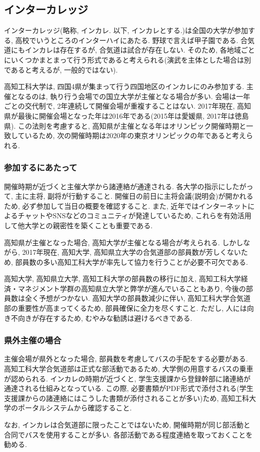\documentclass[a4j,titlepage]{jarticle}
\begin{document}
\subsection{インターカレッジ}
インターカレッジ(略称, インカレ. 以下, インカレとする.)は全国の大学が参加する, 高校でいうところのインターハイにあたる. 野球で言えば甲子園である. 合気道にもインカレは存在するが, 合気道は試合が存在しない. そのため, 各地域ごとにいくつかまとまって行う形式であると考えられる(演武を主体とした場合は別であると考えるが, 一般的ではない). \par
高知工科大学は, 四国4県が集まって行う四国地区のインカレにのみ参加する. 主催となるのは, 執り行う会場での国立大学が主催となる場合が多い. 会場は一年ごとの交代制で, 2年連続して開催会場が重複することはない. 2017年現在, 高知県が最後に開催会場となった年は2016年である(2015年は愛媛県, 2017年は徳島県). この法則を考慮すると, 高知県が主催となる年はオリンピック開催時期と一致しているため, 次の開催時期は2020年の東京オリンピックの年であると考えられる. \par

\subsubsection{参加するにあたって}
開催時期が近づくと主催大学から諸連絡が通達される. 各大学の指示にしたがって, 主に主将, 副将が行動すること. 開催日の前日に主将会議(説明会)が開かれるため, 必ず参加して当日の概要を確認すること. また, 近年ではインターネットによるチャットやSNSなどのコミュニティが発達しているため, これらを有効活用して他大学との親密性を築くことも重要である. \par
高知県が主催となった場合, 高知大学が主催となる場合が考えられる. しかしながら, 2017年現在, 高知大学, 高知県立大学の合気道部の部員数が芳しくないため, 部員数の多い高知工科大学が率先して協力を行うことが必要不可欠である. \par
高知大学, 高知県立大学, 高知工科大学の部員数の移行に加え, 高知工科大学経済・マネジメント学群の高知県立大学と弊学が進んでいることもあり, 今後の部員数は全く予想がつかない. 高知大学の部員数減少に伴い, 高知工科大学合気道部の重要性が高まってくるため, 部員確保に全力を尽くすこと. ただし, 人には向き不向きが存在するため, むやみな勧誘は避けるべきである.

\subsubsection{県外主催の場合}
主催会場が県外となった場合, 部員数を考慮してバスの手配をする必要がある. 高知工科大学合気道部は正式な部活動であるため, 大学側の用意するバスの乗車が認められる. インカレの時期が近づくと, 学生支援課から登録幹部に諸連絡が通達される仕組みとなっている. この際, 必要書類がPDF形式で添付される(学生支援課からの諸連絡にはこうした書類が添付されることが多い)ため, 高知工科大学のポータルシステムから確認すること. \par
なお, インカレは合気道部に限ったことではないため, 開催時期が同じ部活動と合同でバスを使用することが多い. 各部活動である程度連絡を取っておくことを勧める.
\end{document}
